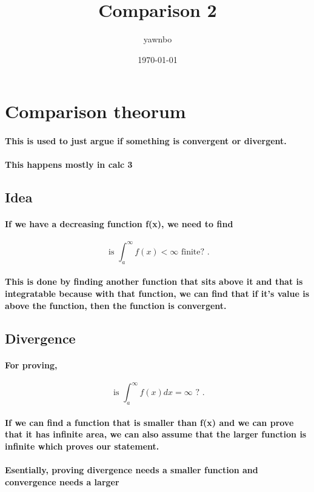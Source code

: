\documentclass[a4paper]{article}
\title{Comparison 2}
\author{yawnbo}
\date{\today}
\begin{document}
\section{Comparison theorum}%
\label{sec:Comparison theoorum}
\paragraph{This is used to just argue if something is convergent or divergent. }
\paragraph{This happens mostly in calc 3 }
\subsection{Idea }%
\label{sub:Idea }
\paragraph{If we have a decreasing function f(x), we need to find}

\[
\text{ is  }\int_{a}^{\infty} f(x) < \infty \text{ finite? }
.\] 
\paragraph{This is done by finding another function that sits above it and that is integratable because with that function, we can find that if it's value is above the function, then the function is convergent. }
\subsection{Divergence}%
\label{sub:Divergence}
\paragraph{For proving,}
\[
\text{ is } \int_{a}^{\infty} f(x)dx=\infty \text{ ? }
.\] 
\paragraph{If we can find a function that is smaller than f(x) and we can prove that it has infinite area, we can also assume that the larger function is infinite which proves our statement. }
\paragraph{Esentially, proving divergence needs a smaller function and convergence needs a larger}
\end{document}

